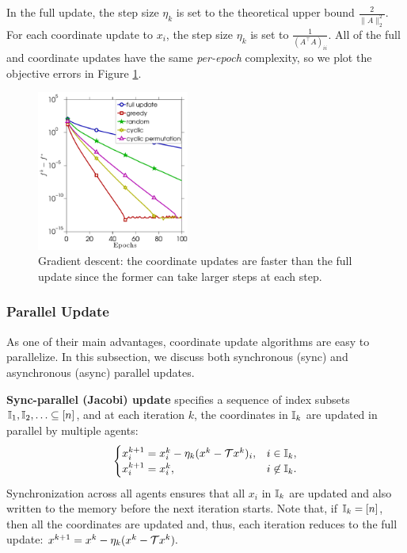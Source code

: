 In the full update, the step size $\eta_k$ is set to the theoretical upper bound $\frac{2}{\|A\|_2^2}$. For each coordinate update to $x_i$, the step size $\eta_k$ is set to $\frac{1}{(A^{\top}A)_{ii}}$. All of the full and coordinate updates have the same \emph{per-epoch} complexity, so we plot the objective errors in Figure \ref{fig:ls_full_vs_coord}.
\begin{figure}[!htbp] \centering
\includegraphics[width=50mm]{./figs/randn_matrix_cropped}

\caption{Gradient descent: the coordinate updates are faster than the full update since the former can take larger steps at each step.}
\label{fig:ls_full_vs_coord}
\end{figure}



\subsubsection{Parallel Update} As one of their main advantages, coordinate update algorithms are easy to parallelize. In this subsection, we discuss  both synchronous (sync) and asynchronous (async) parallel updates.

\textbf{Sync-parallel (Jacobi) update} specifies a sequence of index subsets $\mathbb{I}_1,\mathbb{I}_2,\ldots \subseteq [n]$, and at each iteration $k$,  the coordinates in $\mathbb{I}_k$ are updated in parallel by multiple agents:
$$ \begin{cases}
x^{k+1}_{i} = x_{i}^k - \eta_k(x^k-\cT x^k)_{i},& i\in \II_k,\\
x^{k+1}_{i} = x_i^k,&i\not\in \II_k.
\end{cases}
$$
Synchronization across all agents ensures that  all $x_i$ in $\mathbb{I}_k$ are updated and also written to the memory before the next iteration starts. Note that, if $\mathbb{I}_k= [n]$, then all the coordinates are updated and, thus, each iteration reduces to the full update: $x^{k+1} =  x^k - \eta_k(x^k-{\mathcal{T}} x^k).$ 

